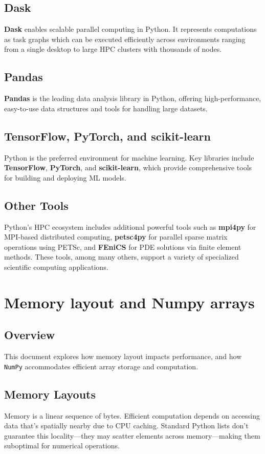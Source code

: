 \documentclass[11pt,a4paper]{book}
\begin{document}
\section{Dask}
\textbf{Dask} enables scalable parallel computing in Python. It represents computations as task graphs which can be executed efficiently across environments ranging from a single desktop to large HPC clusters with thousands of nodes.

\section{Pandas}
\textbf{Pandas} is the leading data analysis library in Python, offering high-performance, easy-to-use data structures and tools for handling large datasets.

\section{TensorFlow, PyTorch, and scikit-learn}
Python is the preferred environment for machine learning. Key libraries include \textbf{TensorFlow}, \textbf{PyTorch}, and \textbf{scikit-learn}, which provide comprehensive tools for building and deploying ML models.

\section{Other Tools}
Python’s HPC ecosystem includes additional powerful tools such as \textbf{mpi4py} for MPI-based distributed computing, \textbf{petsc4py} for parallel sparse matrix operations using PETSc, and \textbf{FEniCS} for PDE solutions via finite element methods. These tools, among many others, support a variety of specialized scientific computing applications.

\chapter{Memory layout and Numpy arrays}

\section*{Overview}
This document explores how memory layout impacts performance, and how \texttt{NumPy} accommodates efficient array storage and computation.

\section{Memory Layouts}
Memory is a linear sequence of bytes. Efficient computation depends on accessing data that's spatially nearby due to CPU caching. Standard Python lists don't guarantee this locality—they may scatter elements across memory—making them suboptimal for numerical operations.
\end{document}
